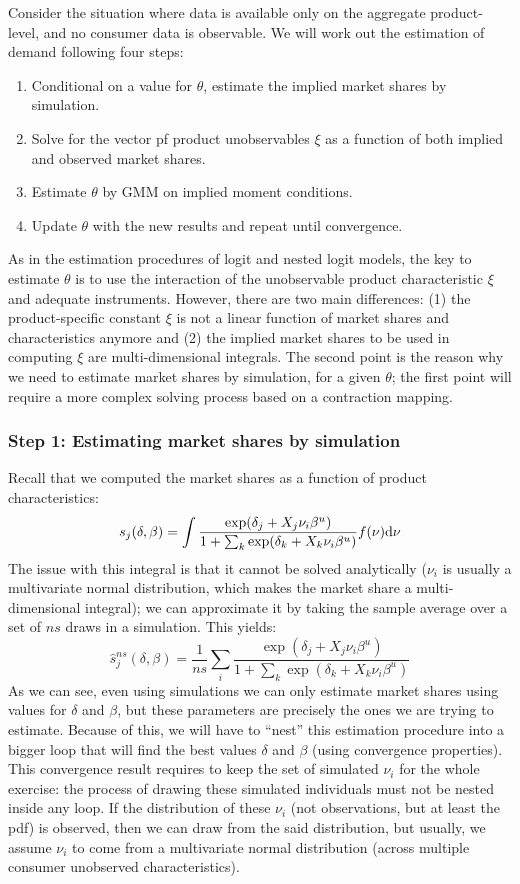 Consider the situation where data is available only on the aggregate product-level, and no consumer data is observable. We will work out the estimation of demand following four steps:\begin{enumerate}
\item Conditional on a value for $\theta$, estimate the implied market shares by simulation.
\item Solve for the vector pf product unobservables $\xi$ as a function of both implied and observed market shares.
\item Estimate $\theta$ by GMM on implied moment conditions.
\item Update $\theta$ with the new results and repeat until convergence.
\end{enumerate}

As in the estimation procedures of logit and nested logit models, the key to estimate $\theta$ is to use the interaction of the unobservable product characteristic $\xi$ and adequate instruments. However, there are two main differences: (1) the product-specific constant $\xi$ is not a linear function of market shares and characteristics anymore and (2) the implied market shares to be used in computing $\xi$ are multi-dimensional integrals. The second point is the reason why we need to estimate market shares by simulation, for a given $\theta$; the first point will require a more complex solving process based on a contraction mapping.


\subsubsection{Step 1: Estimating market shares by simulation}

Recall that we computed the market shares as a function of product characteristics: $$s_j(\delta, \beta) = \int \frac{\exp(\delta_j + X_j\nu_i\beta^u)}{1 + \sum_k \exp(\delta_k + X_k\nu_i\beta^u) } f(\nu) \mathrm{d}\nu $$
The issue with this integral is that it cannot be solved analytically ($\nu_i$ is usually a multivariate normal distribution, which makes the market share a multi-dimensional integral); we can approximate it by taking the sample average over a set of $ns$ draws in a simulation. This yields: $$\hat s_j^{ns}(\delta, \beta) = \frac{1}{ns} \sum_{i} \frac{\exp(\delta_j + X_j\nu_i\beta^u)}{1 + \sum_k \exp(\delta_k + X_k\nu_i\beta^u) } $$
As we can see, even using simulations we can only estimate market shares using values for $\delta$ and $\beta$, but these parameters are precisely the ones we are trying to estimate. Because of this, we will have to ``nest'' this estimation procedure into a bigger loop that will find the best values $\delta$ and $\beta$ (using convergence properties). This convergence result requires to keep the set of simulated $\nu_i$ for the whole exercise: the process of drawing these simulated individuals must not be nested inside any loop. If the distribution of these $\nu_i$ (not observations, but at least the pdf) is observed, then we can draw from the said distribution, but usually, we assume $\nu_i$ to come from a multivariate normal distribution (across multiple consumer unobserved characteristics). 

